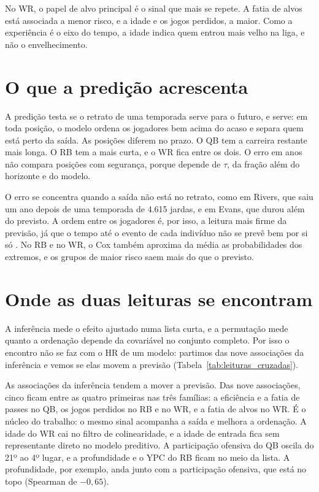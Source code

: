 No WR, o papel de alvo principal é o sinal que mais se repete. A fatia de alvos está associada a menor risco, e a idade e os jogos perdidos, a maior. Como a experiência é o eixo do tempo, a idade indica quem entrou mais velho na liga, e não o envelhecimento.

\section{O que a predição acrescenta}
\label{sec:interpretacao_posicao}

A predição testa se o retrato de uma temporada serve para o futuro, e serve: em toda posição, o modelo ordena os jogadores bem acima do acaso e separa quem está perto da saída. As posições diferem no prazo. O QB tem a carreira restante mais longa. O RB tem a mais curta, e o WR fica entre os dois. O erro em anos não compara posições com segurança, porque depende de $\tau$, da fração além do horizonte e do modelo.

O erro se concentra quando a saída não está no retrato, como em Rivers, que saiu um ano depois de uma temporada de 4.615 jardas, e em Evans, que durou além do previsto. A ordem entre os jogadores é, por isso, a leitura mais firme da previsão, já que o tempo até o evento de cada indivíduo não se prevê bem por si só \citep{graf1999}. No RB e no WR, o Cox também aproxima da média as probabilidades dos extremos, e os grupos de maior risco saem mais do que o previsto.

\section{Onde as duas leituras se encontram}
\label{sec:disc_encontro}

A inferência mede o efeito ajustado numa lista curta, e a permutação mede quanto a ordenação depende da covariável no conjunto completo. Por isso o encontro não se faz com o HR de um modelo: partimos das nove associações da inferência e vemos se elas movem a previsão (Tabela~\ref{tab:leituras_cruzadas}).

As associações da inferência tendem a mover a previsão. Das nove associações, cinco ficam entre as quatro primeiras nas três famílias: a eficiência e a fatia de passes no QB, os jogos perdidos no RB e no WR, e a fatia de alvos no WR. É o núcleo do trabalho: o mesmo sinal acompanha a saída e melhora a ordenação. A idade do WR cai no filtro de colinearidade, e a idade de entrada fica sem representante direto no modelo preditivo. A participação ofensiva do QB oscila do 21º ao 4º lugar, e a profundidade e o YPC do RB ficam no meio da lista. A profundidade, por exemplo, anda junto com a participação ofensiva, que está no topo (Spearman de $-0{,}65$).

